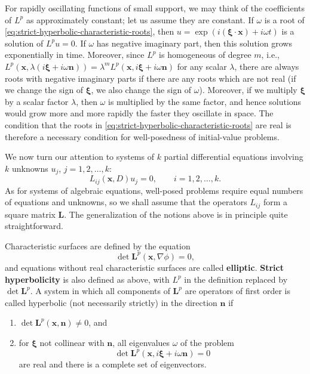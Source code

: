 For rapidly oscillating functions of small support, we may think of the coefficients of $L^p$ as approximately constant; let us assume they are constant. If $\omega$ is a root of \eqref{eq:strict-hyperbolic-characteristic-roots}, then $u=\exp(i(\bm{\xi}\cdot\bm{x})+i\omega t)$ is a solution of $L^pu=0$. If $\omega$ has negative imaginary part, then this solution grows exponentially in time. Moreover, since $L^p$ is homogeneous of degree $m$, i.e., $L^p(\bm{x},\lambda(i\bm{\xi}+i\omega\bm{n}))=\lambda^mL^p(\bm{x},i\bm{\xi}+i\omega\bm{n})$ for any scalar $\lambda$, there are always roots with negative imaginary parts if there are any roots which are not real (if we change the sign of $\bm{\xi}$, we also change the sign of $\omega$). Moreover, if we multiply $\bm{\xi}$ by a scalar factor $\lambda$, then $\omega$ is multiplied by the same factor, and hence solutions would grow more and more rapidly the faster they oscillate in space. The condition that the roots in \eqref{eq:strict-hyperbolic-characteristic-roots} are real is therefore a necessary condition for well-posedness of initial-value problems.

We now turn our attention to systems of $k$ partial differential equations involving $k$ unknowns $u_j$, $j=1,2,\ldots,k$:
\begin{equation}\label{eq:linear-pde-system}
L_{ij}(\bm{x},D)u_j=0,\qquad i=1,2,\ldots,k.
\end{equation}
As for systems of algebraic equations, well-posed problems require equal numbers of equations and unknowns, so we shall assume that the operators $L_{ij}$ form a square matrix $\bm{L}$. The generalization of the notions above is in principle quite straightforward.

\begin{Definition}
\label{def:system-pde-type}
Characteristic surfaces are defined by the equation
\begin{equation}\label{eq:system-characteristic-surface}
\det\bm{L}^p(\bm{x},\nabla\phi)=0,
\end{equation}
and equations without real characteristic surfaces are called \textbf{elliptic}. \textbf{Strict hyperbolicity} is also defined as above, with $L^p$ in the definition replaced by $\det\bm{L}^p$. A system in which all components of $\bm{L}^p$ are operators of first order is called hyperbolic (not necessarily strictly) in the direction $\bm{n}$ if
\begin{enumerate}
\item $\det\bm{L}^p(\bm{x},\bm{n})\ne0$, and
\item for $\bm{\xi}$ not collinear with $\bm{n}$, all eigenvalues $\omega$ of the problem
\[
\det\bm{L}^p(\bm{x},i\bm{\xi}+i\omega\bm{n})=0
\]
are real and there is a complete set of eigenvectors.\end{enumerate}
\end{Definition}

